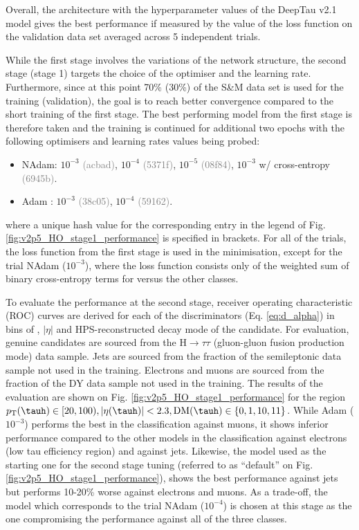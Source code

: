 Overall, the architecture with the hyperparameter values of the DeepTau v2.1 model gives the best performance if measured by the value of the loss function on the validation data set averaged across 5 independent trials.

While the first stage involves the variations of the network structure, the second stage (stage 1) targets the choice of the optimiser and the learning rate. Furthermore, since at this point 70\% (30\%) of the S\&M data set is used for the training (validation), the goal is to reach better convergence compared to the short training of the first stage. The best performing model from the first stage is therefore taken and the training is continued for additional two epochs with the following optimisers and learning rates values being probed:
\begin{itemize}
    \item NAdam: $10^{-3}$ \textcolor{gray}{(acbad)}, $10^{-4}$ \textcolor{gray}{(5371f)}, $10^{-5}$ \textcolor{gray}{(08f84)}, $10^{-3}$ w/ cross-entropy \textcolor{gray}{(6945b)}.
    \item Adam \cite{kingma2014adam}: $10^{-3}$ \textcolor{gray}{(38c05)}, $10^{-4}$ \textcolor{gray}{(59162)}.
\end{itemize}

where a unique hash value for the corresponding entry in the legend of Fig. \ref{fig:v2p5_HO_stage1_performance} is specified in brackets. For all of the trials, the loss function from the first stage is used in the minimisation, except for the trial NAdam ($10^{-3}$), where the loss function consists only of the weighted sum of binary cross-entropy terms for \tauh versus the other classes.

To evaluate the performance at the second stage, receiver operating characteristic (ROC) curves are derived for each of the discriminators (Eq. \ref{eq:d_alpha}) in bins of \pt, $|\eta|$ and HPS-reconstructed decay mode of the \tauh candidate. For evaluation, genuine \tauh candidates are sourced from the $\text{H} \to \tau\tau$ (gluon-gluon fusion production mode) data sample. Jets are sourced from the fraction of the semileptonic \ttbar data sample not used in the training. Electrons and muons are sourced from the fraction of the DY data sample not used in the training. The results of the evaluation are shown on Fig. \ref{fig:v2p5_HO_stage1_performance} for the region $p_\text{T}(\tauh) \in [20,100), |\eta(\tauh)| < 2.3, \text{DM}(\tauh) \in \{0,1,10,11\}$. While Adam ($10^{-3}$) performs the best in the classification against muons, it shows inferior performance compared to the other models in the classification against electrons (low tau efficiency region) and against jets. Likewise, the model used as the starting one for the second stage tuning (referred to as \enquote{default} on Fig. \ref{fig:v2p5_HO_stage1_performance}), shows the best performance against jets but performs 10-20\% worse against electrons and muons. As a trade-off, the model which corresponds to the trial NAdam ($10^{-4}$) is chosen at this stage as the one compromising the performance against all of the three classes.

